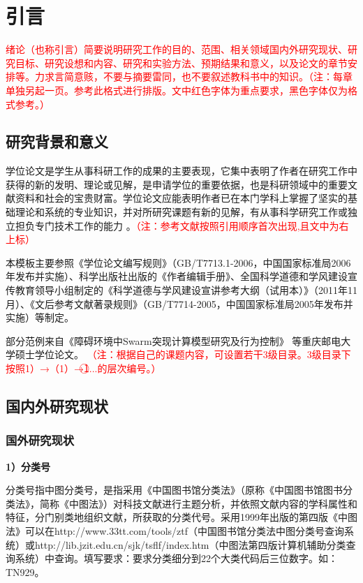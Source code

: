 
\chapter{引言}
\textcolor{red}{绪论（也称引言）简要说明研究工作的目的、范围、相关领域国内外研究现状、研究目标、研究设想和内容、研究和实验方法、预期结果和意义，以及论文的章节安排等。力求言简意赅，不要与摘要雷同，也不要叙述教科书中的知识。（注：每章单独另起一页。参考此格式进行排版。文中红色字体为重点要求，黑色字体仅为格式参考。）}
\section{研究背景和意义}
学位论文是学生从事科研工作的成果的主要表现，它集中表明了作者在研究工作中获得的新的发明、理论或见解，是申请学位的重要依据，也是科研领域中的重要文献资料和社会的宝贵财富。学位论文应能表明作者已在本门学科上掌握了坚实的基础理论和系统的专业知识，并对所研究课题有新的见解，有从事科学研究工作或独立担负专门技术工作的能力 。\textcolor{red}{（注：参考文献按照引用顺序首次出现,且文中为右上标）}

本模板主要参照《学位论文编写规则》（GB/T7713.1-2006，中国国家标准局2006年发布并实施）、科学出版社出版的《作者编辑手册》、全国科学道德和学风建设宣传教育领导小组制定的《科学道德与学风建设宣讲参考大纲（试用本）》（2011年11月）、《文后参考文献著录规则》（GB/T7714-2005，中国国家标准局2005年发布并实施）等制定。

部分范例来自《障碍环境中Swarm突现计算模型研究及行为控制》 等重庆邮电大学硕士学位论文。
\textcolor{red}{（注：根据自己的课题内容，可设置若干3级目录。3级目录下按照1）→（1）→\textcircled{1}...的层次编号。）}
\section{国内外研究现状}
\subsection{国外研究现状}
\textbf{1）分类号}

分类号指中图分类号，是指采用《中国图书馆分类法》（原称《中国图书馆图书分类法》，简称《中图法》）对科技文献进行主题分析，并依照文献内容的学科属性和特征，分门别类地组织文献，所获取的分类代号。采用1999年出版的第四版《中图法》可以在http://www.33tt.com/tools/ztf（中国图书馆分类法中图分类号查询系统）或http://lib.jzit.edu.cn/sjk/tsflf/index.htm（中图法第四版计算机辅助分类查询系统）中查询。填写要求：要求分类细分到22个大类代码后三位数字。如：TN929。

